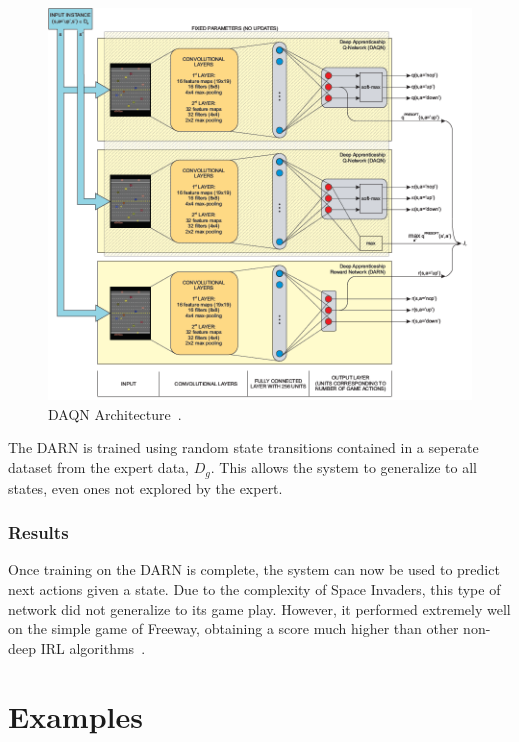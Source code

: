 \documentclass[12pt,american]{report}
\begin{document}
\begin{figure}
\centering
\includegraphics[scale=.85]{images/darn-dal.png}
\caption{DAQN Architecture~\cite{markovikj2014deep}.}
\label{fig:darn-dal}
\end{figure}
The DARN is trained using random state transitions contained in a seperate dataset from the expert data, $D_g$.  This allows the system to generalize to all states, even ones not explored by the expert. 

\subsubsection{Results}
Once training on the DARN is complete, the system can now be used to predict next actions given a state. Due to the complexity of Space Invaders, this type of network did not generalize to its game play. However, it performed extremely well on the simple game of Freeway, obtaining a score much higher than other non-deep IRL algorithms~\cite{markovikj2014deep}. 

\section{Examples}
\end{document}
